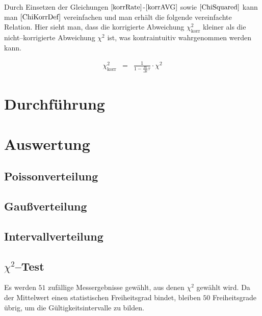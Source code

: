 \documentclass[12pt,a4paper]{scrartcl}
\numberwithin{equation}{section} %
\renewcommand{\[}{} %
\renewcommand{\]}{\noindent} %
\begin{document}
Durch Einsetzen der Gleichungen \(\eqref{korrRate}\)-\(\eqref{korrAVG}\)
sowie \(\eqref{ChiSquared}\) kann man \(\eqref{ChiKorrDef}\)
vereinfachen und man erhält die folgende vereinfachte Relation. Hier
sieht man, dass die korrigierte Abweichung \(\chi^2_\mathrm{korr}\)
kleiner als die nicht--korrigierte Abweichung \(\chi^2\) ist, was
kontraintuitiv wahrgenommen werden kann.

\[
\begin{eqnarray}
    \chi^2_\mathrm{korr} &=&
        \frac{1}{1 - \frac{m}{\Delta t}\tau} \cdot \chi^2
\end{eqnarray}
\]

\clearpage
\hypertarget{durchfuxfchrung}{%
\section{Durchführung}\label{durchfuxfchrung}}

\clearpage
\hypertarget{auswertung}{%
\section{Auswertung}\label{auswertung}}

\hypertarget{poissonverteilung}{%
\subsection{Poissonverteilung}\label{poissonverteilung}}

\hypertarget{gauuxdfverteilung}{%
\subsection{Gaußverteilung}\label{gauuxdfverteilung}}

\hypertarget{intervallverteilung}{%
\subsection{Intervallverteilung}\label{intervallverteilung}}

\hypertarget{chi2test}{%
\subsection{\texorpdfstring{\(\chi^2\)--Test}{\textbackslash chi\^{}2--Test}}\label{chi2test}}

Es werden \(51\) zufällige Messergebnisse gewählt, aus denen \(\chi^2\)
gewählt wird. Da der Mittelwert einen statistischen Freiheitsgrad
bindet, bleiben \(50\) Freiheitsgrade übrig, um die
Gültigkeitsintervalle zu bilden.
\end{document}
